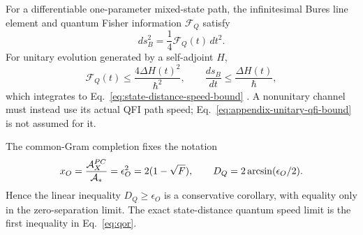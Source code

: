 \documentclass[11pt]{article}
\begin{document}
For a differentiable one-parameter mixed-state path, the infinitesimal Bures
line element and quantum Fisher information \(\mathcal F_Q\) satisfy
\begin{equation}
  ds_B^2=\frac14\mathcal F_Q(t)\,dt^2.
  \label{eq:appendix-bures-qfi}
\end{equation}
For unitary evolution generated by a self-adjoint \(H\),
\begin{equation}
  \mathcal F_Q(t)\leq\frac{4\Delta H(t)^2}{\hbar^2},
  \qquad
  \frac{ds_B}{dt}\leq\frac{\Delta H(t)}{\hbar},
  \label{eq:appendix-unitary-qfi-bound}
\end{equation}
which integrates to Eq.~\eqref{eq:state-distance-speed-bound}
\cite{Taddei2013}.  A nonunitary channel must instead use its actual QFI path
speed; Eq.~\eqref{eq:appendix-unitary-qfi-bound} is not assumed for it.

The common-Gram completion fixes the notation
\[
 x_O={\mathcal A_X^{PC}\over\mathcal A_*}
 =\epsilon_O^2=2(1-\sqrt F),
 \qquad
 D_Q=2\arcsin(\epsilon_O/2).
\]
Hence the linear inequality
\(D_Q\geq\epsilon_O\) is a conservative corollary, with equality only in the
zero-separation limit.  The exact state-distance quantum speed limit is the
first inequality in Eq.~\eqref{eq:qor}.



\end{document}
